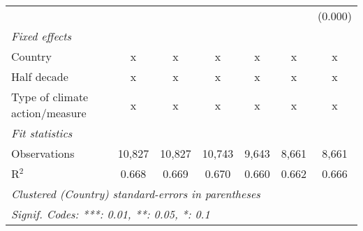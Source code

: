 \begin{tabular}{lcccccc}
                                                &         &               &               &                &                & (0.000)\\   
   \emph{Fixed effects}\\
   Country                                      & x       & x             & x             & x              & x              & x\\  
   Half decade                                  & x       & x             & x             & x              & x              & x\\  
   Type of climate action/measure               & x       & x             & x             & x              & x              & x\\  
   \midrule \emph{Fit statistics}\\
   Observations                                 & 10,827  & 10,827        & 10,743        & 9,643          & 8,661          & 8,661\\  
   R$^2$                                        & 0.668   & 0.669         & 0.670         & 0.660          & 0.662          & 0.666\\  
   \midrule
   \multicolumn{7}{l}{\emph{Clustered (Country) standard-errors in parentheses}}\\
   \multicolumn{7}{l}{\emph{Signif. Codes: ***: 0.01, **: 0.05, *: 0.1}}\\
\end{tabular}
\par\endgroup


